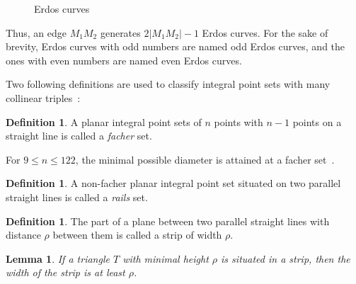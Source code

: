 \documentclass[a4paper,14pt]{article} %
\theoremstyle{plain}
\newtheorem{lemma}[theorem]{Lemma}
\theoremstyle{definition}
\newtheorem{definition}[theorem]{Definition}
\begin{document}
\begin{figure}
\caption{Erdos curves}
\label{fig:Erdos_curves_numbered}
\end{figure}

Thus, an edge $M_1 M_2$ generates $2|M_1 M_2| - 1$ Erdos curves.
For the sake of brevity, Erdos curves with odd numbers are named odd Erdos curves,
and the ones with even numbers are named even Erdos curves.

Two following definitions are used to classify integral point sets
with many collinear triples~\cite{avdeev2019particular}:

\begin{definition}
	A planar integral point sets of $n$ points with $n-1$ points on a straight line is called
	a \emph{facher} set.
\end{definition}
For $9\leq n\leq 122$, the minimal possible diameter is attained at a facher set~\cite{kurz2008bounds}.

\begin{definition}
	A non-facher planar integral point set situated on two parallel straight lines
	is called a \emph{rails} set.
\end{definition}


\begin{definition}
	The part of a plane between two parallel straight lines with distance $\rho$ between them
	is called a strip of width $\rho$.
\end{definition}

\begin{lemma}
	\cite{smurov1998stripcoverings}
	\label{lem:smurov_min_height}
	If a triangle $T$ with minimal height $\rho$ is situated in a strip,
	then the width of the strip is at least $\rho$.
\end{lemma}
\end{document}
